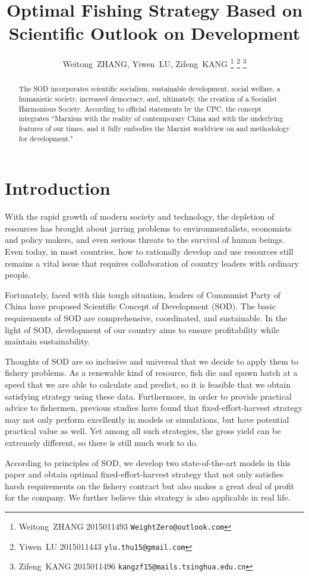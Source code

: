 \documentclass{IEEEtran}
\title{Optimal Fishing Strategy Based on Scientific Outlook on Development}
\author{
    Weitong~ZHANG, Yiwen~LU, Zifeng~KANG
    \thanks{Weitong~ZHANG 2015011493  \texttt{WeightZero@outlook.com}}
    \thanks{Yiwen~LU 2015011443  \texttt{ylu.thu15@gmail.com}}
    \thanks{Zifeng~KANG 2015011496  \texttt{kangzf15@mails.tsinghua.edu.cn}}
}
\begin{document}
\maketitle

\begin{abstract}
    The SOD incorporates scientific socialism, sustainable development, social welfare, a humanistic society, increased democracy, and, ultimately, the creation of a Socialist Harmonious Society. According to official statements by the CPC, the concept integrates ``Marxism with the reality of contemporary China and with the underlying features of our times, and it fully embodies the Marxist worldview on and methodology for development."
\end{abstract}

\section{Introduction}

With the rapid growth of modern society and technology, the depletion of resources has brought about jarring problems to environmentalists, economists and policy makers, and even serious threats to the survival of human beings. Even today, in most countries, how to rationally develop and use resources still remains a vital issue that requires collaboration of country leaders with ordinary people.

Fortunately, faced with this tough situation, leaders of Communist Party of China have proposed Scientific Concept of Development (SOD). The basic requirements of SOD are comprehensive, coordinated, and sustainable. In the light of SOD, development of our country aims to ensure profitability while maintain sustainability.

Thoughts of SOD are so inclusive and universal that we decide to apply them to fishery problems. As a renewable kind of resource, fish die and spawn hatch at a speed that we are able to calculate and predict, so it is feasible that we obtain satisfying strategy using these data. Furthermore, in order to provide practical advice to fishermen, previous studies have found that fixed-effort-harvest strategy may not only perform excellently in models or simulations, but have potential practical value as well. Yet among all such strategies, the gross yield can be extremely different, so there is still much work to do. 

According to principles of SOD, we develop two state-of-the-art models in this paper and obtain optimal fixed-effort-harvest strategy that not only satisfies harsh requirements on the fishery contract but also makes a great deal of profit for the company. We further believe this strategy is also applicable in real life. 
\end{document}
